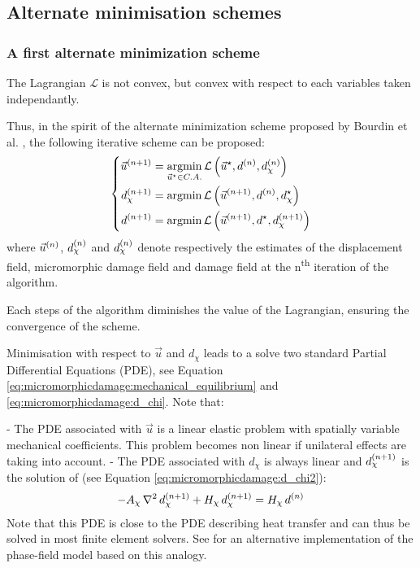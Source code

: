 \subsection{Alternate minimisation schemes}
\label{sec:micromorphicdamage:alternate_minimisation}

\subsubsection{A first alternate minimization scheme}

The Lagrangian \(\mathcal{L}\) is not convex, but convex with respect to
each variables taken independantly.

Thus, in the spirit of the alternate minimization scheme proposed by
Bourdin et al. \cite{bourdin_numerical_2000}, the following iterative scheme
can be proposed:
\[
\left\{
\begin{aligned}
\iter{n+1}{\vec{u}} &= \underset{\vec{u}^{\star}\in C.A.}{\argmin}\, \mathcal{L}\paren{\vec{u}^{\star},\iter{n}{d},\iter{n}{d_{\chi}}}\\
\iter{n+1}{d_{\chi}} &= \argmin \,\mathcal{L}\paren{\iter{n+1}{\vec{u}},\iter{n}{d},d_{\chi}^{\star}} \\
\iter{n+1}{d} &= \argmin \,\mathcal{L}\paren{\iter{n+1}{\vec{u}},d^{\star},\iter{n+1}{d_{\chi}}} \\
\end{aligned}
\right.
\]
where \(\iter{n}{\vec{u}}\), \(\iter{n}{d_{\chi}}\) and
\(\iter{n}{d_{\chi}}\) denote respectively the estimates of the
displacement field, micromorphic damage field and damage field at the
n\textsuperscript{th} iteration of the algorithm.

Each steps of the algorithm diminishes the value of the Lagrangian,
ensuring the convergence of the scheme.

Minimisation with respect to \(\vec{u}\) and \(d_{\chi}\) leads to a
solve two standard Partial Differential Equations (PDE), see Equation
\eqref{eq:micromorphicdamage:mechanical_equilibrium} and
\eqref{eq:micromorphicdamage:d_chi}. Note that:

- The PDE associated with \(\vec{u}\) is a linear elastic problem with
  spatially variable mechanical coefficients. This problem becomes non
  linear if unilateral effects are taking into account.
- The PDE associated with \(d_{\chi}\) is always linear and
  \(\iter{n+1}{d_{\chi}}\) is the solution of (see Equation
  \eqref{eq:micromorphicdamage:d_chi2}):
  \[
  -A_{\chi}\,\LaplacianOperator\,\iter{n+1}{d_{\chi}}+H_{\chi}\,\iter{n+1}{d_{\chi}}=
  H_{\chi}\,\iter{n}{d}
  \]
  Note that this PDE is close to the PDE describing heat transfer and can
  thus be solved in most finite element solvers. See \cite{azinpour_simple_2018}
  for an alternative implementation of the phase-field model based on this analogy.

